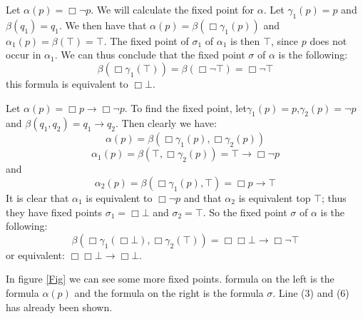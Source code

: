 \documentclass[../main.tex]{subfiles}
\begin{document}
\begin{exmp}
	Let $\alpha(p)=\Box \neg p$. We will calculate the fixed point for
	$\alpha$. Let $\gamma_1 (p)=p$ and $\beta(q_1)=q_1$. We then have that
	$\alpha(p)=\beta(\Box\gamma_1(p))$ and $\alpha_1(p)=\beta(\top)=\top$.
	The fixed point of $\sigma_1$ of $\alpha_1$ is then $\top$, since $p$
	does not occur in $\alpha_1$. We can thus conclude that the fixed point
	$\sigma$ of $\alpha$ is the following:
	\[\beta(\Box\gamma_1(\top))=\beta(\Box\neg\top)=\Box\neg\top\]
	this formula is equivalent to $\Box\bot$.
\end{exmp}
\begin{exmp}
	Let $\alpha(p)=\Box p\rightarrow\Box\neg p$. To find the fixed point,
	let$\gamma_1(p)=p$,$\gamma_2(p)=\neg p$ and
	$\beta(q_1,q_2)=q_1\rightarrow q_2$. Then clearly we have:
	\[\alpha(p)=\beta(\Box\gamma_1(p),\Box\gamma_2(p))\]
	\[\alpha_1(p)=\beta(\top,\Box\gamma_2(p))=\top\rightarrow\Box\neg p\]
	and 
	\[\alpha_2(p)=\beta(\Box\gamma_1(p),\top)=\Box p\rightarrow \top\]
	It is clear that $\alpha_1$ is equivalent to $\Box\neg p$ and that
	$\alpha_2$ is equivalent top $\top$; thus they have fixed points
	$\sigma_1=\Box\bot$ and $\sigma_2=\top$. So the fixed point $\sigma$
	of $\alpha$ is the following:
	\[\beta(\Box\gamma_1(\Box\bot),\Box\gamma_2(\top))=\Box\Box\bot\rightarrow\Box\neg\top\]
	or equivalent: $\Box\Box\bot\rightarrow\Box\bot$.
\end{exmp}
In figure \ref{Fig} we can see some more fixed points. 
formula on the left is the formula $\alpha(p)$ and the formula on the right is
the formula $\sigma$. Line (3) and (6) has already been shown.
\end{document}
